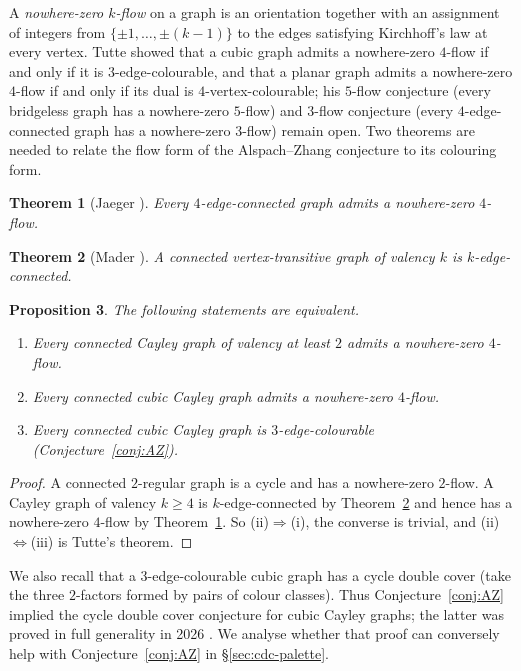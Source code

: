\documentclass[11pt,a4paper]{article}
\newtheorem{theorem}{Theorem}[section]
\newtheorem{proposition}[theorem]{Proposition}
\theoremstyle{definition}
\theoremstyle{remark}
\begin{document}
A \emph{nowhere-zero $k$-flow} on a graph is an orientation together with an assignment of integers from $\{\pm1,\dots,\pm(k-1)\}$ to the edges satisfying Kirchhoff's law at every vertex.  Tutte \cite{Tutte54,Tutte66} showed that a cubic graph admits a nowhere-zero $4$-flow if and only if it is $3$-edge-colourable, and that a planar graph admits a nowhere-zero $4$-flow if and only if its dual is $4$-vertex-colourable; his $5$-flow conjecture (every bridgeless graph has a nowhere-zero $5$-flow) and $3$-flow conjecture (every $4$-edge-connected graph has a nowhere-zero $3$-flow) remain open.  Two theorems are needed to relate the flow form of the Alspach--Zhang conjecture to its colouring form.

\begin{theorem}[Jaeger \cite{Jaeger79}]\label{thm:jaeger}
Every $4$-edge-connected graph admits a nowhere-zero $4$-flow.
\end{theorem}

\begin{theorem}[Mader \cite{Mader71}]\label{thm:mader}
A connected vertex-transitive graph of valency $k$ is $k$-edge-connected.
\end{theorem}

\begin{proposition}\label{prop:flow}
The following statements are equivalent.
\begin{enumerate}[label=\textup{(\roman*)}]
\item Every connected Cayley graph of valency at least $2$ admits a nowhere-zero $4$-flow.
\item Every connected cubic Cayley graph admits a nowhere-zero $4$-flow.
\item Every connected cubic Cayley graph is $3$-edge-colourable \textup{(Conjecture~\ref{conj:AZ})}.
\end{enumerate}
\end{proposition}
\begin{proof}
A connected $2$-regular graph is a cycle and has a nowhere-zero $2$-flow.  A Cayley graph of valency $k\ge4$ is $k$-edge-connected by Theorem~\ref{thm:mader} and hence has a nowhere-zero $4$-flow by Theorem~\ref{thm:jaeger}.  So (ii)$\Rightarrow$(i), the converse is trivial, and (ii)$\Leftrightarrow$(iii) is Tutte's theorem.
\end{proof}

We also recall that a $3$-edge-colourable cubic graph has a cycle double cover (take the three $2$-factors formed by pairs of colour classes).  Thus Conjecture~\ref{conj:AZ} implied the cycle double cover conjecture for cubic Cayley graphs; the latter was proved in full generality in 2026 \cite{OpenAICDC26,Geelen26,Oum26}.  We analyse whether that proof can conversely help with Conjecture~\ref{conj:AZ} in \S\ref{sec:cdc-palette}.
\end{document}
